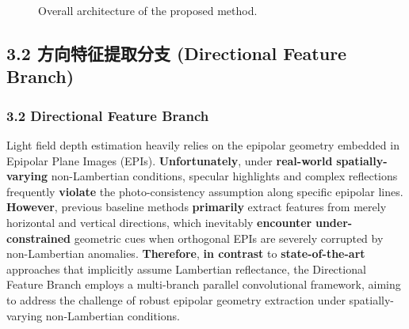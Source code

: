 \documentclass[journal]{IEEEtran}
\begin{document}
\begin{figure}[t]
\caption{Overall architecture of the proposed method.}
\label{fig:architecture}
\end{figure}

\subsection{3.2 方向特征提取分支 (Directional Feature Branch)}

\subsubsection{3.2 Directional Feature Branch}

Light field depth estimation heavily relies on the epipolar geometry embedded in Epipolar Plane Images (EPIs). \textbf{Unfortunately}, under \textbf{real-world} \textbf{spatially-varying} non-Lambertian conditions, specular highlights and complex reflections frequently \textbf{violate} the photo-consistency assumption along specific epipolar lines. \textbf{However}, previous baseline methods \textbf{primarily} extract features from merely horizontal and vertical directions, which inevitably \textbf{encounter} \textbf{under-constrained} geometric cues when orthogonal EPIs are severely corrupted by non-Lambertian anomalies. \textbf{Therefore}, \textbf{in contrast} to \textbf{state-of-the-art} approaches that implicitly assume Lambertian reflectance, the Directional Feature Branch employs a multi-branch parallel convolutional framework, aiming to address the challenge of robust epipolar geometry extraction under spatially-varying non-Lambertian conditions.
\end{document}
